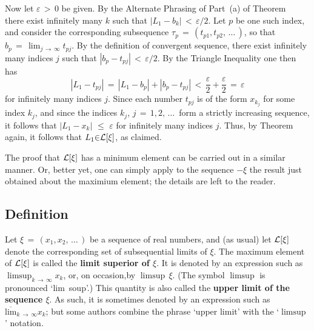         Now let ${\varepsilon}\,>\,0$ be given. By the Alternate Phrasing of Part~(a) of Theorem~ there exist infinitely many $k$ such that $|L_{1}-b_{k}|\,<\,{\varepsilon}/2$.
    Let $p$ be one such index, and consider the corresponding subsequence ${\tau}_{p} \,=\, (t_{p1},t_{p2},\,{\ldots}\,)$, so that $b_{p} \,=\, \lim_{j \,{\rightarrow}\, {\infty}} t_{pj}$.
    By the definition of convergent sequence, there exist infinitely many indices $j$ such that $|b_{p}-t_{pj}|\,<\,{\varepsilon}/2$.
    By the Triangle Inequality one then has
        \begin{displaymath}
        |L_{1}-t_{pj}| \,=\, |L_{1}-b_{p}| + |b_{p}-t_{pj}|\,<\,\frac{{\varepsilon}}{2} + \frac{{\varepsilon}}{2} \,=\, {\varepsilon}
        \end{displaymath}
    for infinitely many indices $j$.
    Since each number $t_{pj}$ is of the form $x_{k_{j}}$ for some index $k_{j}$, and since the indices $k_{j}$, $j \,=\, 1,2,\,{\ldots}\,$ form a strictly increasing sequence, it follows that $|L_{1}-x_{k}|\,\,{\leq}\,\,{\varepsilon}$ for infinitely many indices $j$.
    Thus, by Theorem~ again, it follows that $L_{1}{\in}{\cal L}[{\xi}]$, as claimed. 

        
        The proof that ${\cal L}[{\xi}]$ has a minimum element can be carried out in a similar manner.
    Or, better yet, one can simply apply to the sequence $-{\xi}$ the result just obtained about the maximium element; the details are left to the reader.
        
\V
\V


            \subsection{\small{\bf Definition}}
            \label{DefC50.150}


        Let ${\xi} \,=\, (x_{1},x_{2},\,{\ldots}\,)$ be a sequence of real numbers, and (as usual) let ${\cal L}[{\xi}]$ denote the corresponding set of subsequential limits of ${\xi}$.
    The maximum element of ${\cal L}[{\xi}]$ is called the {\bf limit superior of ${\xi}$}.
    It is denoted by an expression such as ${\displaystyle \limsup_{k \,{\rightarrow}\, {\infty}} x_{k}}$, or, on occasion,by $\limsup\,{\xi}$.
    (The symbol $\limsup$ is pronounced `lim~soup'.)
    This quantity is also called the {\bf upper limit of the sequence ${\xi}$}. As such, it is sometimes denoted by an expression such as $\overline{\mbox{lim}}_{k \,{\rightarrow}\, {\infty}} x_{k}$;
    but some authors combine the phrase `upper limit' with the `$\limsup$' notation.

